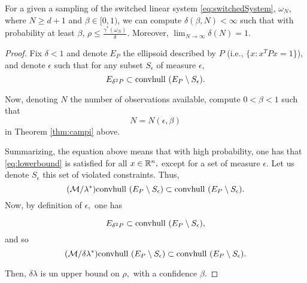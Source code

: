 \begin{theorem} \label{thm:mainTheorem} For a given a sampling of the switched linear system \eqref{eq:switchedSystem}, $\omega_N$, where $N \geq d+1$ and $\beta \in [0,1)$, we can compute $\delta(\beta, N) < \infty$ such that with probability at least $\beta$, $\rho \leq \frac{\gamma^*(\omega_N)}{\delta}$. Moreover, $\lim_{N \to \infty} \delta(N) = 1$.
\end{theorem}
\begin{proof}
Fix $\delta<1$ and denote $E_P$ the ellipsoid described by $P$ (i.e., $\{x:x^TPx= 1\}$), and denote $\epsilon$ such that for any subset $S_\epsilon$ of measure $\epsilon,$ 
$$ E_{\delta^2P} \subset  \mbox{convhull } (E_P\setminus S_\epsilon) .$$ 
  	
Now, denoting $N$ the number of observations available, compute $0< \beta< 1$ such that $$N=N(\epsilon,\beta)$$ in Theorem \ref{thm:campi} above. 

Summarizing, the equation above means that with high probability, one has that \eqref{eq:lowerbound} is satisfied for all $x\in \mathbb{R}^n,$ except for a set of measure $\epsilon.$  Let us denote $S_\epsilon$ this set of violated constraints.  Thus, $$(\mathcal{M}/\lambda^*) \mbox{convhull } (E_P\setminus S_\epsilon) \subset \mbox{convhull } (E_P\setminus S_\epsilon).$$  Now, by definition of $\epsilon,$ one has

$$ E_{\delta^2P} \subset  \mbox{convhull } (E_P\setminus S_\epsilon) ,$$ and so
$$
(\mathcal{M}/\delta \lambda^*) \mbox{convhull } (E_P \setminus S_\epsilon) \subset \mbox{convhull } (E_P\setminus S_\epsilon).$$

Then, $\delta\lambda$ is un upper bound on $\rho,$ with a confidence $\beta.$ 
\end{proof}